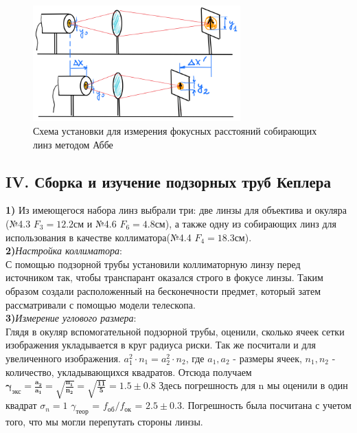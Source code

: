 \begin{figure}[h!]
    \centering
    \includegraphics[width=8cm]{images/setup3.png}
    \caption{Схема установки для измерения фокусных расстояний собирающих линз методом Аббе}
\end{figure}

\subsection*{IV. Сборка и изучение подзорных труб Кеплера}
\textbf{1)} Из имеющегося набора линз выбрали три: две линзы для объектива и окуляра (№4.3 $F_3 = 12.2 $см и №4.6 $F_6 = 4.8 $см), а также одну из собирающих линз для использования в качестве коллиматора(№4.4 $F_4 = 18.3 $см).\\

\textbf{2)}\textit{Настройка коллиматора}: \\
С помощью подзорной трубы установили коллиматорную линзу перед источником так, чтобы транспарант оказался строго в фокусе линзы. Таким образом создали расположенный на бесконечности предмет, который затем рассматривали с помощью модели телескопа. \\

\textbf{3)}\textit{Измерение углового размера}: \\
Глядя в окуляр вспомогательной подзорной трубы, оценили, сколько ячеек сетки изображения укладывается в круг радиуса риски. Так же посчитали и для увеличенного изображения. $a_1^2 \cdot n_1 = a_2^2 \cdot n_2$, где $a_1, a_2$ - размеры ячеек, $n_1, n_2$ - количество, укладывающихся квадратов. Отсюда получаем $\bm{\gamma_{\text{экс}} = \frac{a_2}{a_1} = \sqrt{\frac{n_1}{n_2}} = \sqrt{\frac{11}{5}} = 1.5\pm0.8}$ Здесь погрешность для n мы оценили в один квадрат $\sigma_n = 1$  $\gamma_{\text{теор}}$ = $f_{\text{об}}/f_{\text{ок}}$ = $2.5 \pm 0.3$. Погрешность была посчитана с учетом того, что мы могли перепутать стороны линзы.\\

